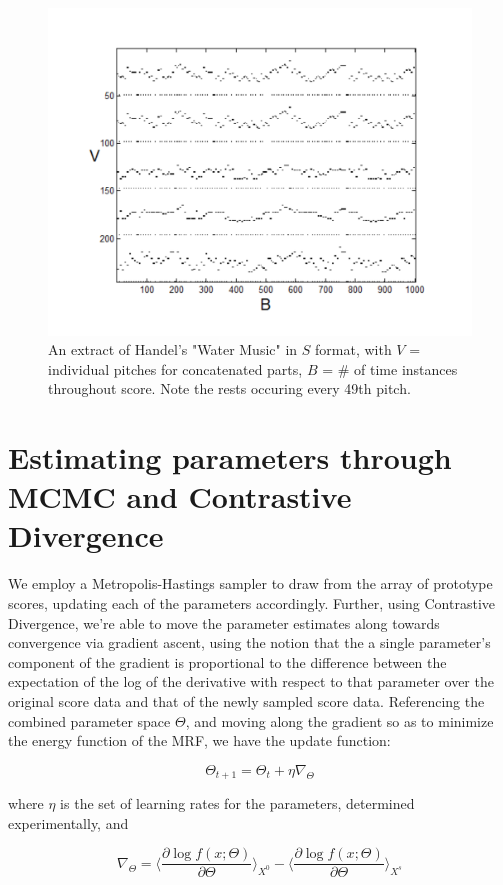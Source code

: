 \documentclass{article}
\begin{document}
\begin{figure}
\centering
\includegraphics[width=.9\textwidth]{figures/handel(extract).pdf}
\caption{An extract of Handel's "Water Music" in $S$ format, with $V$ = individual pitches for concatenated parts, $B$ = \# of time instances throughout score.  Note the rests occuring every 49th pitch.}
\label{fig-1}
\end{figure}


\section{Estimating parameters through MCMC and Contrastive Divergence}
We employ a Metropolis-Hastings sampler to draw from the array of prototype scores, updating each of the parameters accordingly.  Further, using Contrastive Divergence, we're able to move the parameter estimates along towards convergence via gradient ascent, using the notion that the a single parameter's component of the gradient is proportional to the difference between the expectation of the log of the derivative with respect to that parameter over the original score data and that of the newly sampled score data.  Referencing the combined parameter space $\Theta$, and moving along the gradient so as to minimize the energy function of the MRF, we have the update function:

\[\Theta_{t+1} = \Theta_t + \eta\nabla_{\Theta}\]

where $\eta$ is the set of learning rates for the parameters, determined experimentally, and

\[\nabla_{\Theta} = \langle\frac{\partial\log{f(x;\Theta)}}{\partial\Theta}\rangle_{X^0} - \langle\frac{\partial\log{f(x;\Theta)}}{\partial\Theta}\rangle_{X^s}\]
\end{document}
